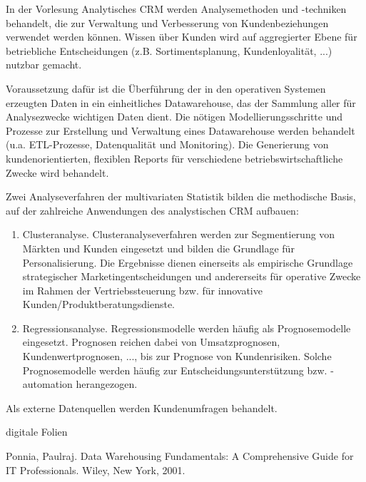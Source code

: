 \begin{course}
\begin{content}
In der Vorlesung Analytisches CRM werden Analysemethoden und -techniken behandelt, die zur Verwaltung und Verbesserung von Kundenbeziehungen verwendet werden können. Wissen über Kunden wird auf aggregierter Ebene für betriebliche Entscheidungen (z.B. Sortimentsplanung, Kundenloyalität, ...) nutzbar gemacht.

 

Voraussetzung dafür ist die Überführung der in den operativen Systemen erzeugten Daten in ein einheitliches Datawarehouse, das der Sammlung aller für Analysezwecke wichtigen Daten dient. Die nötigen Modellierungsschritte und Prozesse zur Erstellung und Verwaltung eines Datawarehouse werden behandelt (u.a. ETL-Prozesse, Datenqualität und Monitoring). Die Generierung von kundenorientierten, flexiblen Reports für verschiedene betriebswirtschaftliche Zwecke wird behandelt.

 

Zwei Analyseverfahren der multivariaten Statistik bilden die methodische Basis, auf der zahlreiche Anwendungen des analystischen CRM aufbauen:

 \begin{enumerate}\item Clusteranalyse. Clusteranalyseverfahren werden zur Segmentierung von Märkten und Kunden eingesetzt und bilden die Grundlage für Personalisierung. Die Ergebnisse dienen einerseits als empirische Grundlage strategischer Marketingentscheidungen und andererseits für operative Zwecke im Rahmen der Vertriebssteuerung bzw. für innovative Kunden/Produktberatungsdienste.  \item Regressionsanalyse. Regressionsmodelle werden häufig als Prognosemodelle eingesetzt. Prognosen reichen dabei von Umsatzprognosen, Kundenwertprognosen, ..., bis zur Prognose von Kundenrisiken. Solche Prognosemodelle werden häufig zur Entscheidungsunterstützung bzw. -automation herangezogen.  \end{enumerate}

Als externe Datenquellen werden Kundenumfragen behandelt.


\end{content}

\begin{media}digitale Folien

\end{media}

\begin{literature} 

Ponnia, Paulraj. Data Warehousing Fundamentals: A Comprehensive Guide for IT Professionals. Wiley, New York, 2001.


\end{literature}
\end{course}
